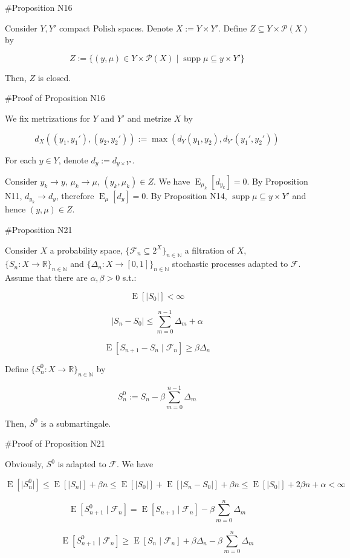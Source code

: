 \documentclass[a4paper]{article}
\DeclareMathOperator{\Supp}{supp}
\DeclareMathOperator{\E}{E}
\newcommand{\Nats}{\mathbb{N}}
\newcommand{\Reals}{\mathbb{R}}
\newcommand{\Sq}[2]{\{#1\}_{#2 \in \Nats}}
\newcommand{\Sqn}[1]{\Sq{#1}{n}}
\newcommand{\Abs}[1]{\lvert #1 \rvert}
\newcommand{\Prob}{\mathcal{P}}
\newcommand{\F}{\mathcal{F}}
\begin{document}
\#Proposition N16

Consider ${Y,Y'}$ compact Polish spaces. Denote ${X:=Y \times Y'}$. Define ${Z \subseteq Y \times \Prob(X)}$ by

$$Z:=\{(y,\mu) \in Y \times \Prob(X) \mid \Supp \mu \subseteq y \times Y'\}$$

Then, ${Z}$ is closed.

\#Proof of Proposition N16

We fix metrizations for ${Y}$ and ${Y'}$ and metrize ${X}$ by 

$${d_X((y_1,y_1'),(y_2,y_2')):=\max(d_Y(y_1,y_2),d_{Y'}(y_1',y_2'))}$$

For each ${y \in Y}$, denote ${d_{y}:=d_{y \times Y'}}$.

Consider ${y_k \rightarrow y}$, ${\mu_k \rightarrow \mu}$, ${(y_k, \mu_k) \in Z}$. We have ${\E_{\mu_k}[d_{y_k}]=0}$. By Proposition N11, ${d_{y_k} \rightarrow d_y}$, therefore ${\E_\mu[d_y] = 0}$. By Proposition N14, ${\Supp \mu \subseteq y \times Y'}$ and hence ${(y,\mu) \in Z}$.

\#Proposition N21

Consider ${X}$ a probability space, ${\{\F_n \subseteq 2^X\}_{n \in \Nats}}$ a filtration of ${X}$, ${\{S_n:X \rightarrow \Reals\}_{n \in \Nats}}$ and ${\{\Delta_n:X \rightarrow [0,1]\}_{n \in \Nats}}$ stochastic processes adapted to ${\F}$. Assume that there are ${\alpha,\beta > 0}$ s.t.:

$$\E[\Abs{S_0}] < \infty$$

$$\Abs{S_{n}-S_0} \leq \sum_{m=0}^{n-1} \Delta_m + \alpha$$

$$\E[S_{n+1} - S_n \mid \F_n] \geq \beta \Delta_n$$

Define ${\Sqn{S^0_n: X \rightarrow \Reals}}$ by

$$S^0_n := S_n - \beta \sum_{m=0}^{n-1} \Delta_m$$
 
Then, ${S^0}$ is a submartingale.

\#Proof of Proposition N21

Obviously, ${S^0}$ is adapted to ${\F}$. We have

$$\E[\Abs{S^0_{n}}] \leq \E[\Abs{S_n}] + \beta n \leq \E[\Abs{S_0}] + \E[\Abs{S_n - S_0}] + \beta n \leq \E[\Abs{S_0}] + 2\beta n + \alpha < \infty$$

$$\E[S^0_{n+1} \mid \F_n] = \E[S_{n+1} \mid \F_n] - \beta \sum_{m = 0}^{n} \Delta_m$$

$$\E[S^0_{n+1} \mid \F_n] \geq \E[S_{n} \mid \F_n] + \beta \Delta_n - \beta \sum_{m = 0}^{n} \Delta_m$$
\end{document}
